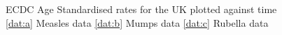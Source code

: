 \documentclass{article}
\theoremstyle{definition}
\begin{document}
\begin{figure}
  \centering
  \par
  \centering
  \par
  \centering
  \caption{ECDC Age Standardised rates for the UK plotted against time \ref{dat:a} Measles data \ref{dat:b} Mumps data \ref{dat:c} Rubella data}
  \label{fig:dat}
\end{figure}
\end{document}
